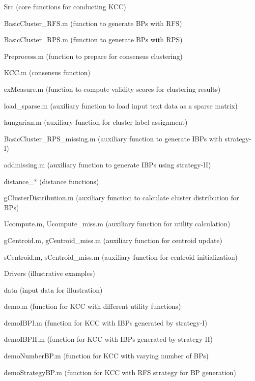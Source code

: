 \documentclass[10pt]{acmtrans2e}
\begin{document}
\begin{compactitem}
  \item \textsf{Src} (core functions for conducting KCC)
  \begin{compactitem}
   \item \textsf{BasicCluster\_RFS.m} (function to generate BPs with RFS)
   \item \textsf{BasicCluster\_RPS.m} (function to generate BPs with RPS)
   \item \textsf{Preprocess.m} (function to prepare for consensus clustering)
   \item \textsf{KCC.m} (consensus function)
   \item \textsf{exMeasure.m} (function to compute validity scores for clustering results)

   \item \textsf{load\_sparse.m} (auxiliary function to load input text data as a sparse matrix)
   \item \textsf{hungarian.m} (auxiliary function for cluster label assignment)
   \item \textsf{BasicCluster\_RPS\_missing.m} (auxiliary function to generate IBPs with strategy-I)
   \item \textsf{addmissing.m} (auxiliary function to generate IBPs using strategy-II)
   \item \textsf{distance\_*} (distance functions)
   \item \textsf{gClusterDistribution.m} (auxiliary function to calculate cluster distribution for BPs)
   \item \textsf{Ucompute.m, Ucompute\_miss.m} (auxiliary function for utility calculation)
   \item \textsf{gCentroid.m, gCentroid\_miss.m} (auxiliary function for centroid update)
   \item \textsf{sCentroid.m, sCentroid\_miss.m} (auxiliary function for centroid initialization)
  \end{compactitem}
  \item \textsf{Drivers} (illustrative examples)
  \begin{compactitem}
   \item \textsf{data} (input data for illustration)
   \item \textsf{demo.m} (function for KCC with different utility functions)
   \item \textsf{demoIBPI.m} (function for KCC with IBPs generated by strategy-I)
   \item \textsf{demoIBPII.m} (function for KCC with IBPs generated by strategy-II)
   \item \textsf{demoNumberBP.m} (function for KCC with varying number of BPs)
   \item \textsf{demoStrategyBP.m} (function for KCC with RFS strategy for BP generation)
  \end{compactitem}
\end{compactitem}
\end{document}
